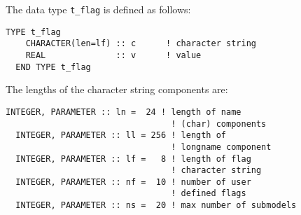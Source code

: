 The data type {\tt t\_flag} is defined as follows:
%
\begin{lstlisting}[caption=data type {\tt t\_flag}]
  TYPE t_flag
    CHARACTER(len=lf) :: c      ! character string
    REAL              :: v      ! value
  END TYPE t_flag
\end{lstlisting}
%
The lengths of the character string components are:
%
\begin{lstlisting}[caption=Length of strings]
  INTEGER, PARAMETER :: ln =  24 ! length of name 
                                 ! (char) components
  INTEGER, PARAMETER :: ll = 256 ! length of 
                                 ! longname component
  INTEGER, PARAMETER :: lf =   8 ! length of flag 
                                 ! character string
  INTEGER, PARAMETER :: nf =  10 ! number of user 
                                 ! defined flags
  INTEGER, PARAMETER :: ns =  20 ! max number of submodels
\end{lstlisting}

